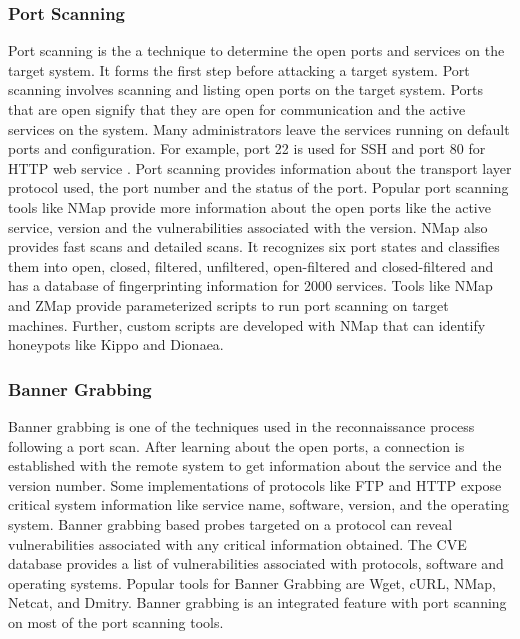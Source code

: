 \subsubsection{Port Scanning}
Port scanning is the a technique to determine the open ports and services on the target system. It forms the first step before attacking a target system. Port scanning involves scanning and listing open ports on the target system. Ports that are open signify that they are open for communication and the active services on the system. Many administrators leave the services running on default ports and configuration. For example, port 22 is used for SSH and port 80 for HTTP web service . Port scanning provides information about the transport layer protocol used, the port number and the status of the port. Popular port scanning tools like NMap\cite{NMap} provide more information about the open ports like the active service, version and the vulnerabilities associated with the version. NMap also provides fast scans and detailed scans. It recognizes six port states and classifies them into open, closed, filtered, unfiltered, open-filtered and closed-filtered and has a database of fingerprinting information for 2000 services. 
Tools like NMap and ZMap \cite{zmap} provide parameterized scripts to run port scanning on target machines. Further, custom scripts are  developed with NMap that can identify honeypots like Kippo and Dionaea.  

\subsubsection{Banner Grabbing}
Banner grabbing is one of the techniques used in the reconnaissance process following a port scan. After learning about the open ports, a connection is established with the remote system to get information about the service and the version number. Some implementations of protocols like FTP and HTTP expose critical system information like service name, software, version, and the operating system. Banner grabbing based probes targeted on a protocol can reveal vulnerabilities associated with any critical information obtained. The CVE database \cite{CVE} provides a list of vulnerabilities associated with protocols, software and operating systems. Popular tools for Banner Grabbing are Wget, cURL, NMap, Netcat, and Dmitry.  Banner grabbing is an integrated feature with port scanning on most of the port scanning tools.  

